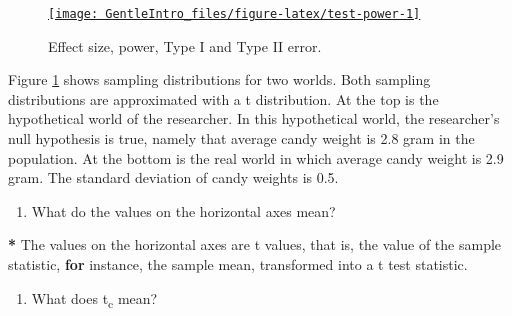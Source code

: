 \documentclass[a4paper]{book}
\newenvironment{Shaded}{\begin{snugshade}}{\end{snugshade}}
\newcommand{\KeywordTok}[1]{\textcolor[rgb]{0,0,0}{\textbf{#1}}}
\newcommand{\DecValTok}[1]{\textcolor[rgb]{0.00,0.00,0.00}{#1}}
\newcommand{\StringTok}[1]{\textcolor[rgb]{0.00,0.00,0.00}{#1}}
\newcommand{\ControlFlowTok}[1]{\textcolor[rgb]{0.00,0.00,0.00}{\textbf{#1}}}
\newcommand{\OperatorTok}[1]{\textcolor[rgb]{0.00,0.00,0.00}{\textbf{#1}}}
\newcommand{\NormalTok}[1]{#1}
\providecommand{\tightlist}{%
  \setlength{\itemsep}{0pt}\setlength{\parskip}{0pt}}
\theoremstyle{definition}
\theoremstyle{definition}
\theoremstyle{definition}
\theoremstyle{remark}
\begin{document}
\begin{figure}[H]
\href{http://82.196.4.233:3838/apps/type1vs2/}{\texttt{[image: GentleIntro\_files/figure-latex/test-power-1]} }\caption{Effect size, power, Type I and Type II error.}\label{fig:test-power}
\end{figure}

Figure \ref{fig:test-power} shows sampling distributions for two worlds.
Both sampling distributions are approximated with a t distribution. At
the top is the hypothetical world of the researcher. In this
hypothetical world, the researcher's null hypothesis is true, namely
that average candy weight is 2.8 gram in the population. At the bottom
is the real world in which average candy weight is 2.9 gram. The
standard deviation of candy weights is 0.5.

\begin{enumerate}
\def\labelenumi{\arabic{enumi}.}
\tightlist
\item
  What do the values on the horizontal axes mean?
\end{enumerate}

\begin{Shaded}
\begin{Highlighting}[]
\OperatorTok{*}\StringTok{ }\NormalTok{The values on the horizontal axes are t values, that is, the value of the}
\NormalTok{sample statistic, }\ControlFlowTok{for}\NormalTok{ instance, the sample mean, transformed into a t test}
\NormalTok{statistic.}
\end{Highlighting}
\end{Shaded}

\begin{enumerate}
\def\labelenumi{\arabic{enumi}.}
\setcounter{enumi}{1}
\tightlist
\item
  What does t\textsubscript{c} mean?
\end{enumerate}

\begin{Shaded}
\end{Shaded}
\end{document}
